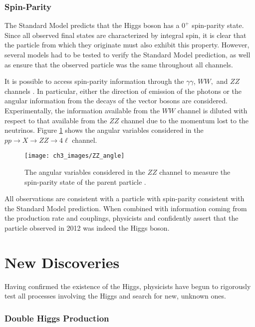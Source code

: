 \documentclass[10pt,a4paper]{book}
\begin{document}
\subsubsection{Spin-Parity}
The Standard Model predicts that the Higgs boson has a $0^+$ spin-parity state. Since all observed final states are characterized by integral spin, it is clear that the particle from which they originate must also exhibit this property. However, several models had to be tested to verify the Standard Model prediction, as well as ensure that the observed particle was the same throughout all channels.

It is possible to access spin-parity information through the $\gamma\gamma$, $WW,$ and $ZZ$ channels \cite{ATLAS:2013xga, ATLAS:2015zhl, CMS:2014nkk}. In particular, either the direction of emission of the photons or the angular information from the decays of the vector bosons are considered. Experimentally, the information available from the $WW$ channel is diluted with respect to that available from the $ZZ$ channel due to the momentum lost to the neutrinos. Figure \ref{ZZ spin} shows the angular variables considered in the $pp \rightarrow X \rightarrow ZZ \rightarrow 4\ell$ channel.

\begin{figure}
\centering
\texttt{[image: ch3\_images/ZZ\_angle]}
\caption{The angular variables considered in the $ZZ$ channel to measure the spin-parity state of the parent particle \cite{higgs_review}.}
\label{ZZ spin}
\end{figure}

All observations are consistent with a particle with spin-parity consistent with the Standard Model prediction. When combined with information coming from the production rate and couplings, physicists and confidently assert that the particle observed in 2012 was indeed the Higgs boson. 

\section{New Discoveries}

Having confirmed the existence of the Higgs, physicists have begun to rigorously test all processes involving the Higgs and search for new, unknown ones. 

\subsubsection{Double Higgs Production}
\end{document}
